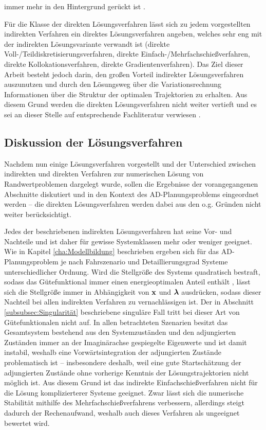 immer mehr in den Hintergrund gerückt ist \cite{Papageorgiou.2012}. 

Für die Klasse der direkten Lösungsverfahren lässt sich zu jedem vorgestellten indirekten Verfahren ein direktes Lösungsverfahren angeben, welches sehr eng mit der indirekten Lösungsvariante verwandt ist (direkte Voll-/Teildiskretisierungsverfahren, direkte Einfach-/Mehrfachschießverfahren, direkte Kollokationsverfahren, direkte Gradientenverfahren). Das Ziel dieser Arbeit besteht jedoch darin, den großen Vorteil indirekter Lösungsverfahren auszunutzen und durch den Lösungsweg über die Variationsrechnung Informationen über die Struktur der optimalen Trajektorien zu erhalten. Aus diesem Grund werden die direkten Lösungsverfahren nicht weiter vertieft und es sei an dieser Stelle auf entsprechende Fachliteratur verwiesen \cite{KnutGraichen.2012,Gerdts.2010,Papageorgiou.2012,Ascher.1995c4,Ascher.1995c5,Betts.1998,Cervantes.2009}.
\subsection{Diskussion der Lösungsverfahren}\label{subsec:Diskussion}
Nachdem nun einige Lösungsverfahren vorgestellt und der Unterschied zwischen indirekten und direkten Verfahren zur numerischen Lösung von Randwertproblemen dargelegt wurde, sollen die Ergebnisse der vorangegangenen Abschnitte diskutiert und in den Kontext des \gls{AD}-Planungsproblems eingeordnet werden -- die direkten Lösungsverfahren werden dabei aus den o.g. Gründen nicht weiter berücksichtigt. 

Jedes der beschriebenen indirekten Lösungsverfahren hat seine Vor- und Nachteile und ist daher für gewisse Systemklassen mehr oder weniger geeignet. Wie in Kapitel \ref{cha:Modellbildung} beschrieben ergeben sich für das \gls{AD}-Planungsproblem je nach Fahrszenario und Detaillierungsgrad Systeme unterschiedlicher Ordnung. Wird die Stellgröße des Systems quadratisch bestraft, sodass das Gütefunktional immer einen energieoptimalen Anteil enthält \cite{KnutGraichen.2012}, lässt sich die Stellgröße immer in Abhängigkeit von $\boldsymbol{\mathrm{x}}$ und $\boldsymbol{\mathrm{\lambda}}$ ausdrücken, sodass dieser Nachteil bei allen indirekten Verfahren zu vernachlässigen ist. Der in Abschnitt \ref{subsubsec:Singularität} beschriebene singuläre Fall tritt bei dieser Art von Gütefunktionalen nicht auf. In allen betrachteten Szenarien besitzt das Gesamtsystem bestehend aus den Systemzuständen und den adjungierten Zuständen immer an der Imaginärachse gespiegelte Eigenwerte und ist damit instabil, weshalb eine Vorwärtsintegration der adjungierten Zustände problematisch ist -- insbesondere deshalb, weil eine gute Startschätzung der adjungierten Zustände ohne vorherige Kenntnis der Lösungstrajektorien nicht möglich ist. Aus diesem Grund ist das indirekte Einfachschießverfahren nicht für die Lösung komplizierterer Systeme geeignet. Zwar lässt sich die numerische Stabilität mithilfe des Mehrfachschießverfahrens verbessern, allerdings steigt dadurch der Rechenaufwand, weshalb auch dieses Verfahren als ungeeignet bewertet wird. 

